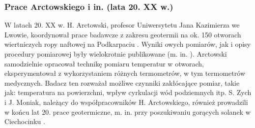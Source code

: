 \documentclass[11.5pt,twoside]{report}
\begin{document}
\subsubsection{Prace Arctowskiego i in. (lata 20. XX w.)}

W latach 20. XX w. H. Arctowski, profesor Uniwersytetu Jana Kazimierza we Lwowie, koordynował prace badawcze z zakresu geotermii na ok. 150 otworach wiertniczych ropy naftowej na Podkarpaciu \parencite{Maj.2010}. Wyniki owych pomiarów, jak i opisy procedury pomiarowej były wielokrotnie publikowane (m. in. \cite{Arctowski.1923c,Arctowski.1923b,Arctowski.1923a}). Arctowski samodzielnie opracował technikę pomiaru temperatur w otworach, eksperymentował z wykorzystaniem różnych termometrów, w tym termometrów medycznych. Badacz ten rozważał możliwe czynniki zakłócające pomiar, takie jak: temperatura na powierzchni, wpływ cyrkulacji wód podziemnych itp. S. Zych i J. Moniak, należący do współpracowników H. Arctowskiego, również prowadzili w końcu lat 20. prace geotermiczne, m. in. przy poszukiwaniu gorących solanek w Ciechocinku \parencite{Maj.2010}.
\end{document}
